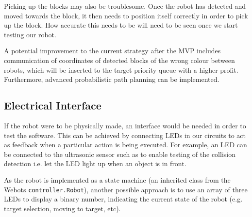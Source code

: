 Picking up the blocks may also be troublesome. Once the robot has detected and moved towards the block, it then needs to position itself correctly in order to pick up the block. How accurate this needs to be will need to be seen once we start testing our robot.





A potential improvement to the current strategy after the MVP includes communication of coordinates of detected blocks of the wrong colour between robots, which will be inserted to the target priority queue with a higher profit. Furthermore, advanced probabilistic path planning can be implemented.

\subsection{Electrical Interface}

If the robot were to be physically made, an interface would be needed in order to test the software. This can be achieved by connecting LEDs in our circuits to act as feedback when a particular action is being executed. For example, an LED can be connected to the ultrasonic sensor such as to enable testing of the collision detection i.e. let the LED light up when an object is in front.

As the robot is implemented as a state machine (an inherited class from the Webots \texttt{controller.Robot}), another possible approach is to use an array of three LEDs to display a binary number, indicating the current state of the robot (e.g. target selection, moving to target, etc).


